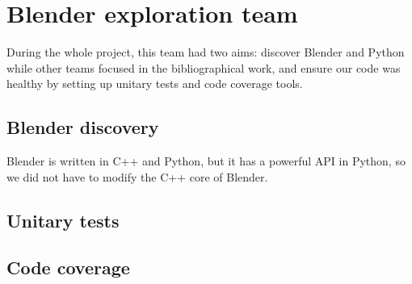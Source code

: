 \section{Blender exploration team}

During the whole project, this team had two aims: discover Blender and
Python while other teams focused in the bibliographical work, and
ensure our code was healthy by setting up unitary tests and code
coverage tools.

\subsection{Blender discovery}

Blender is written in C++ and Python, but it has a powerful API in
Python, so we did not have to modify the C++ core of Blender.

\subsection{Unitary tests}


\subsection{Code coverage}